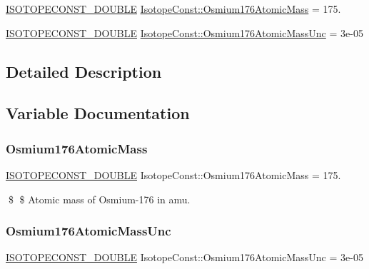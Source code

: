 \begin{DoxyCompactItemize}
\item 
\mbox{\hyperlink{group___isotope_const-_macros_ga8f45a7272ce02c0b4c65c44636ed719a}{I\+S\+O\+T\+O\+P\+E\+C\+O\+N\+S\+T\+\_\+\+D\+O\+U\+B\+LE}} \mbox{\hyperlink{group___isotope_const-_osmium-_os176_ga53bb102d81692d23e47d991985c777ee}{Isotope\+Const\+::\+Osmium176\+Atomic\+Mass}} = 175.
\item 
\mbox{\hyperlink{group___isotope_const-_macros_ga8f45a7272ce02c0b4c65c44636ed719a}{I\+S\+O\+T\+O\+P\+E\+C\+O\+N\+S\+T\+\_\+\+D\+O\+U\+B\+LE}} \mbox{\hyperlink{group___isotope_const-_osmium-_os176_ga959e37dd7fc0e23b2cb0b74bff303cf2}{Isotope\+Const\+::\+Osmium176\+Atomic\+Mass\+Unc}} = 3e-\/05
\end{DoxyCompactItemize}


\subsection{Detailed Description}


\subsection{Variable Documentation}
\mbox{\label{group___isotope_const-_osmium-_os176_ga53bb102d81692d23e47d991985c777ee}} 
\subsubsection{\texorpdfstring{Osmium176\+Atomic\+Mass}{Osmium176AtomicMass}}
{\footnotesize\ttfamily \mbox{\hyperlink{group___isotope_const-_macros_ga8f45a7272ce02c0b4c65c44636ed719a}{I\+S\+O\+T\+O\+P\+E\+C\+O\+N\+S\+T\+\_\+\+D\+O\+U\+B\+LE}} Isotope\+Const\+::\+Osmium176\+Atomic\+Mass = 175.}

\$ \$ Atomic mass of Osmium-\/176 in amu. \mbox{\label{group___isotope_const-_osmium-_os176_ga959e37dd7fc0e23b2cb0b74bff303cf2}} 
\subsubsection{\texorpdfstring{Osmium176\+Atomic\+Mass\+Unc}{Osmium176AtomicMassUnc}}
{\footnotesize\ttfamily \mbox{\hyperlink{group___isotope_const-_macros_ga8f45a7272ce02c0b4c65c44636ed719a}{I\+S\+O\+T\+O\+P\+E\+C\+O\+N\+S\+T\+\_\+\+D\+O\+U\+B\+LE}} Isotope\+Const\+::\+Osmium176\+Atomic\+Mass\+Unc = 3e-\/05}

